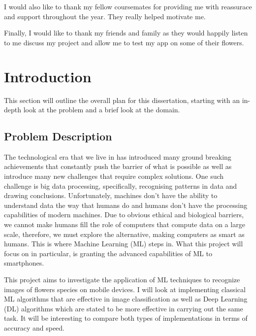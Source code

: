 \documentclass[12pt,a4paper]{report}
\begin{document}
I would also like to thank my fellow coursemates for providing me with reassurace and support throughout the year. They
really helped motivate me.

\par

Finally, I would like to thank my friends and family as they would happily listen to me discuss my project and allow me
to test my app on some of their flowers.

\clearpage
{}
\chapter{Introduction}

This section will outline the overall plan for this dissertation, starting with an in-depth look at the problem and a 
brief look at the domain.

\section{Problem Description}

The technological era that we live in has introduced many ground breaking achievements that constantly push the barrier 
of what is possible as well as introduce many new challenges that require complex solutions. One such challenge is big 
data processing, specifically, recognising patterns in data and drawing conclusions. Unfortunately, machines don't have 
the ability to understand data the way that humans do and humans don't have the processing capabilities of modern 
machines. Due to obvious ethical and biological barriers, we cannot make humans fill the role of computers that compute 
data on a large scale, therefore, we must explore the alternative, making computers as smart as humans. This is where 
Machine Learning (ML) steps in. What this project will focus on in particular,
is granting the advanced capabilities of ML to smartphones.

\par

This project aims to investigate the application of ML techniques to recognize images of flowers species 
on mobile devices. I will look at implementing classical ML algorithms that are effective in image 
classification as well as Deep Learning (DL) algorithms which are stated to be more effective in carrying out the same 
task. It will be interesting to compare both types of implementations in terms of accuracy and speed.
\end{document}
